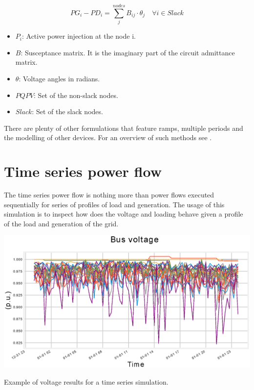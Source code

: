 \documentclass[a4paper,twoside,fleqn]{tufte-book}
\begin{document}
\begin{equation}
PG_i - PD_i=\sum_j^{nodes} B_{ij} \cdot \theta_j  \quad  \forall i \in Slack
\end{equation}

\begin{itemize}
	\item $P_i$: Active power injection at the node i.
	\item $B$: Susceptance matrix. It is the imaginary part of the circuit admittance matrix.
	\item $\theta$: Voltage angles in radians.
	\item $PQPV$: Set of the non-slack nodes.
	
	\item $Slack$: Set of the slack nodes.
\end{itemize}

There are plenty of other formulations that feature ramps, multiple periods and the modelling of other devices.
For an overview of such methods see \cite{taylor2015convex}.

\chapter{Time series power flow}

The time series power flow is nothing more than power flows executed sequentially for series of profiles of load and generation. The usage of this simulation is to inspect how does the voltage and loading behave given a profile of the load and generation of the grid.

\begin{marginfigure}
	\includegraphics[width=\linewidth]{img/Time_series.eps}
	\caption{Example of voltage results for a time series simulation.}
	\label{fig:time_series}
\end{marginfigure}
\end{document}
